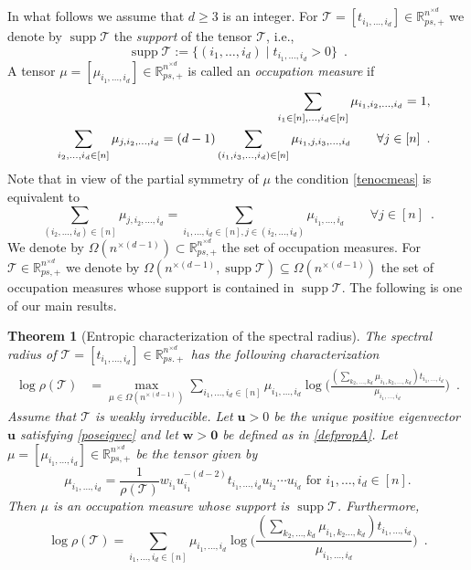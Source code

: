 \documentclass{amsart}
\newcommand{\supp}[1]{\operatorname{supp}{#1}}
\newcommand{\R}{\mathbb{R}}
\newcommand{\uu}{\mathbf{u}}
\newcommand{\w}{\mathbf{w}}
\newcommand{\0}{\mathbf{0}}
\newcommand{\1}{\mathbf{1}}
\newcommand{\cT}{\mathcal{T}}
\newtheorem{theorem}[theo]{Theorem}
\theoremstyle{remark}
\numberwithin{equation}{section} %
\renewcommand{\ge}{\geqslant}
\begin{document}
In what follows we assume that $d\ge 3$ is an integer. 
For $\cT=[t_{i_1,\ldots,i_d}]\in\R_{ps,+}^{n^{\times d}}$
we denote by $\supp \cT$ the \emph{support} of the tensor $\cT$, i.e.,
\[
\supp \cT:= \{(i_1,\dots,i_d)\mid t_{i_1,\dots, i_d}>0 \} \enspace .
\]
A tensor $\mu=[\mu_{i_1,\ldots,i_d}]\in \R_{ps,+}^{n^{\times d}}$ is called
an {\em occupation measure} if
\begin{eqnarray}
 &&\sum_{i_1\in [n],\dots, i_d\in [n]}\mu_{i_1,i_2,\dots, i_d}=1,\notag\\
 &&\sum_{i_2,\dots,i_d\in [n]} 
 \mu_{j,i_2,\dots,i_d} =(d-1) \displaystyle\sum_{(i_1,i_3,\dots,i_d)\in [n]
}
 \mu_{i_1,j,i_3,\dots,i_d} 
 \qquad \forall j\in [n]\enspace .\label{tenocmeas}
\end{eqnarray}
Note that in view of the partial symmetry of $\mu$ the condition \eqref{tenocmeas}
is equivalent to
\[\sum_{(i_2,\dots,i_d)\in[n]} 
 \mu_{j,i_2,\dots,i_d} = \displaystyle\sum_{i_1,\dots,i_d\in [n],j\in (i_2,\dots,i_d) 
}
 \mu_{i_1,\dots,i_d} 
 \qquad \forall j\in [n]\enspace . \]
We denote by $\Omega(n^{\times (d-1)})\subset \R_{ps,+}^{n^{\times d}}$ the set of occupation measures.  For $\cT\in\R_{ps,+}^{n^{\times d}}$ we denote by $\Omega(n^{\times (d-1)},\supp \cT)\subseteq \Omega(n^{\times (d-1)})$ the set of occupation measures whose support is contained in $\supp \cT$.
%
The following is one of our main results.
\begin{theorem}[Entropic characterization of the spectral radius]\label{entropcharsrten}
The spectral radius of $\cT=[t_{i_1,\ldots,i_d}]\in \R_{ps.+}^{n^{\times d}}$ has the following characterization 
\begin{eqnarray}\label{entropcharsrten1}
\log \rho(\cT) &= 
\displaystyle 
\max_{\mu\in \Omega(n^{\times(d-1)})}
\sum_{i_1,\dots,i_d\in [n]}
\mu_{i_1,\dots, i_d} \log \Big(\frac{(\sum_{k_2,\dots, k_d}\mu_{i_1,k_2,\dots, k_d})t_{i_1,\dots, i_d}}{\mu_{i_1,\dots, i_d}}\Big) \enspace .
\label{e-occupation}
\end{eqnarray}
Assume that $\cT$ is weakly irreducible. Let $\uu>0$ be the unique positive eigenvector $\uu$ satisfying \eqref{poseigvec} and let $\w>\0$ be defined as in \eqref{defpropA}.  Let $\mu=[\mu_{i_1,\ldots,i_d}]\in \R_{ps,+}^{n^{\times d}}$ be the tensor given by
\begin{equation}\label{mumaxten}
\mu_{i_1,\ldots,i_d}=\frac{1}{\rho(\cT)} w_{i_1}u_{i_1}^{-(d-2)}t_{i_1,\ldots,i_d}u_{i_2}\cdots u_{i_d} \textrm{ for } i_1,\ldots,i_d\in[n].
\end{equation}
Then $\mu$ is an occupation measure whose support is $\supp \cT$. Furthermore,
\begin{equation}\label{logeqtenT}
\log\rho(\cT)=\sum_{i_1,\ldots,i_d\in [n]} \mu_{i_1,\dots, i_d} \log \Big(\frac{(\sum_{k_2,\dots, k_d}\mu_{i_1,k_2\dots ,k_d})t_{i_1,\dots, i_d}}{\mu_{i_1,\dots ,i_d}}\Big) \enspace .
\end{equation}
\end{theorem}
\end{document}
